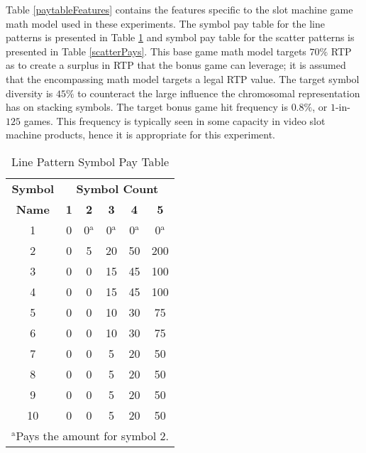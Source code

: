 \documentclass[conference]{IEEEtran}
\begin{document}
\par
Table \ref{paytableFeatures} contains the features specific to the slot machine game math model used in these experiments.
The symbol pay table for the line patterns is presented in Table \ref{linePays} and symbol pay table for the scatter patterns is presented in Table \ref{scatterPays}.
This base game math model targets $70\%$ RTP as to create a surplus in RTP that the bonus game can leverage; it is assumed that the encompassing math model targets a legal RTP value.
The target symbol diversity is $45\%$ to counteract the large influence the chromosomal representation has on stacking symbols.
The target bonus game hit frequency is $0.8\%$, or $1$-in-$125$ games.
This frequency is typically seen in some capacity in video slot machine products, hence it is appropriate for this experiment.
\begin{table}[htbp]
\caption{Line Pattern Symbol Pay Table}
\begin{center}
\begin{tabular}{|c|c|c|c|c|c|}
\hline
\textbf{Symbol}&\multicolumn{5}{|c|}{\textbf{Symbol Count}} \\
\cline{2-6} 
\textbf{Name} & \textbf{1}& \textbf{2}& \textbf{3}& \textbf{4}& \textbf{5} \\
\hline
1& 0 & 0$^{\mathrm{a}}$ & 0$^{\mathrm{a}}$ & 0$^{\mathrm{a}}$ & 0$^{\mathrm{a}}$  \\
\hline
2& 0 & 5 & 20 & 50 & 200  \\
\hline
3& 0 & 0 & 15 & 45 & 100  \\
\hline
4& 0 & 0 & 15 & 45 & 100  \\
\hline
5& 0 & 0 & 10 & 30 & 75  \\
\hline
6& 0 & 0 & 10 & 30 & 75  \\
\hline
7& 0 & 0 & 5 & 20 & 50  \\
\hline
8& 0 & 0 & 5 & 20 & 50  \\
\hline
9& 0 & 0 & 5 & 20 & 50  \\
\hline
10& 0 & 0 & 5 & 20 & 50  \\
\hline
\multicolumn{6}{l}{$^{\mathrm{a}}$Pays the amount for symbol 2.}
\end{tabular}
\label{linePays}
\end{center}
\end{table}
\end{document}
